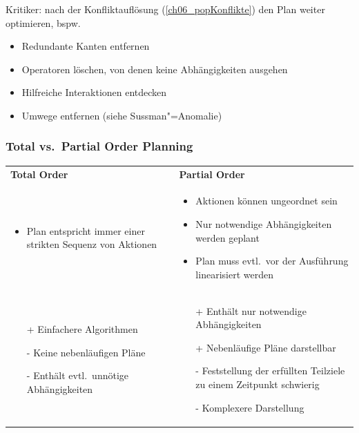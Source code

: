 Kritiker: nach der Konfliktauflösung (\autoref{ch06_popKonflikte}) den Plan weiter optimieren, bspw.\
\begin{itemize}
	\item Redundante Kanten entfernen
	\item Operatoren löschen, von denen keine Abhängigkeiten ausgehen
	\item Hilfreiche Interaktionen entdecken
	\item Umwege entfernen (siehe Sussman"=Anomalie)
\end{itemize}

\subsubsection{Total vs.\ Partial Order Planning}
\begin{tabular}{p{} p{0.5\textwidth}}
\textbf{Total Order} & \textbf{Partial Order}\\
\begin{itemize}
	\item Plan entspricht immer einer strikten Sequenz von Aktionen
\end{itemize}
&
\begin{itemize}
	\item Aktionen können ungeordnet sein
	\item Nur notwendige Abhängigkeiten werden geplant
	\item Plan muss evtl.\ vor der Ausführung linearisiert werden
\end{itemize}
\\
\begin{itemize}
	\item[+] Einfachere Algorithmen
	\item[-] Keine nebenläufigen Pläne
	\item[-] Enthält evtl.\ unnötige Abhängigkeiten
\end{itemize}
&
\begin{itemize}
	\item[+] Enthält nur notwendige Abhängigkeiten
	\item[+] Nebenläufige Pläne darstellbar
	\item[-] Feststellung der erfüllten Teilziele zu einem Zeitpunkt schwierig
	\item[-] Komplexere Darstellung
\end{itemize}
\end{tabular}


